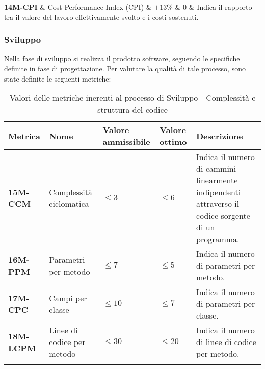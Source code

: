 \begin{longtable}
	\hline
	\textbf{14M-CPI} & Cost Performance Index (CPI)  & $\pm 13\%$                                                  & 0                                         & Indica il rapporto tra il valore del lavoro effettivamente svolto e i costi sostenuti.                                         \\
	\hline
	\caption{Valori delle metriche inerenti al processo di Fornitura}
	\label{table:4}
\end{longtable}

\subsubsection{Sviluppo}
Nella fase di sviluppo si realizza il prodotto software, seguendo le specifiche definite in fase di progettazione.
Per valutare la qualità di tale processo, sono state definite le seguenti metriche:
\begin{longtable}{|>{\centering\arraybackslash}p{}|>{\centering\arraybackslash}p{}|>{\centering\arraybackslash}p{}|>{\centering\arraybackslash}p{}|>{\centering\arraybackslash}p{}|}
	\hline
	\textbf{Metrica}  & \textbf{Nome}              & \textbf{Valore ammissibile} & \textbf{Valore ottimo} & \textbf{Descrizione}                                                                                \\
	\hline
	\endhead
	\textbf{15M-CCM}  & Complessità ciclomatica    & $\leq 3$                    & $\leq 6$               & Indica il numero di cammini linearmente indipendenti attraverso il codice sorgente di un programma. \\
	\hline
	\textbf{16M-PPM}  & Parametri per metodo       & $\leq 7$                    & $\leq 5$               & Indica il numero di parametri per metodo.                                                           \\
	\hline
	\textbf{17M-CPC}  & Campi per classe           & $\leq 10$                   & $\leq 7$               & Indica il numero di parametri per classe.                                                           \\
	\hline
	\textbf{18M-LCPM} & Linee di codice per metodo & $\leq 30$                   & $\leq 20$              & Indica il numero di linee di codice per metodo.                                                     \\
	\hline
	\caption{ Valori delle metriche inerenti al processo di Sviluppo - Complessità e struttura del codice}
	\label{table:5}
\end{longtable}


